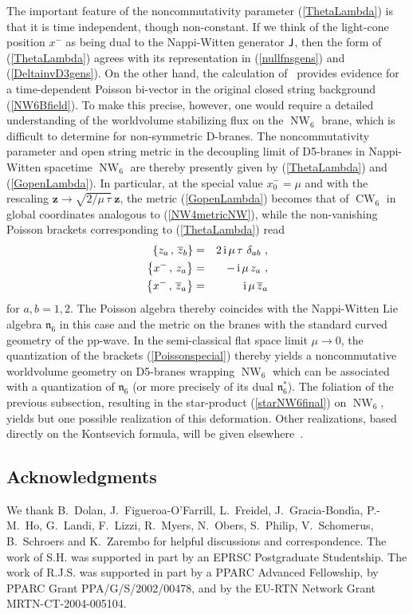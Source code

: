 \documentclass[11pt,a4paper]{article}
\DeclareMathOperator{\NW}{NW}
\DeclareMathOperator{\CW}{CW}
\newcommand{\ii}{{\rm i}}
\newcommand{\mbf}[1]{{\boldsymbol {#1} }}
\def\ii{{\,{\rm i}\,}}
\def\J{{\sf J}}
\def\mz{{\mbf z}}
\newcommand{\beq}{\begin{eqnarray}}
\newcommand{\eeq}{\end{eqnarray}}
\begin{document}
The important feature of the noncommutativity parameter
(\ref{ThetaLambda}) is that it is time independent, though
non-constant. If we think of the light-cone position $x^-$ as being
dual to the Nappi-Witten generator $\J$, then the form of
(\ref{ThetaLambda}) agrees with its representation in
(\ref{nullfnsgens}) and (\ref{DeltainvD3gens}). On the other hand, the
calculation of~\cite{DN1}
provides evidence for a time-dependent Poisson bi-vector in the
original closed string background (\ref{NW6Bfield}). To make this precise,
however, one would require a detailed understanding of the worldvolume
stabilizing flux on the $\NW_6$ brane, which is difficult to determine
for non-symmetric D-branes. The noncommutativity parameter and open
string metric in the decoupling limit of D5-branes in Nappi-Witten
spacetime $\NW_6$ are thereby presently given by (\ref{ThetaLambda})
and (\ref{GopenLambda}). In particular, at the special value
$x_0^-=\mu$ and with the rescaling $\mz\to\sqrt{2/\mu\,\tau}~\mz$, the
metric (\ref{GopenLambda}) becomes that of $\CW_6$ in global
coordinates analogous to (\ref{NW4metricNW}), while the non-vanishing
Poisson brackets corresponding to (\ref{ThetaLambda}) read
\beq
\left\{z_a\,,\,\overline{z}_b\right\}&=&2\ii\mu\,\tau~\delta_{ab} \ ,
\nonumber\\ \left\{x^-\,,\,z_a\right\}&=&-\ii\mu\,z_a \ ,
\nonumber\\ \left\{x^-\,,\,\overline{z}_a\right\}&=&\ii\mu\,
\overline{z}_a
\label{Poissonspecial}\eeq
for $a,b=1,2$. The Poisson algebra thereby coincides with the
Nappi-Witten Lie algebra $\mathfrak{n}_6$ in this case and the metric
on the branes with the standard curved geometry of the pp-wave. In the
semi-classical flat space limit $\mu\to0$, the
quantization of the brackets (\ref{Poissonspecial}) thereby yields a
noncommutative worldvolume geometry on D5-branes wrapping $\NW_6$
which can be associated with a quantization of $\mathfrak{n}_6$ (or
more precisely of its dual $\mathfrak{n}_6^*$). The foliation of the
previous subsection, resulting in the star-product
(\ref{starNW6final}) on $\NW_6$, yields but one possible realization
of this deformation. Other realizations, based directly on the
Kontsevich formula, will be given elsewhere~\cite{inprep}.

\subsection*{Acknowledgments}

We thank B.~Dolan, J.~Figueroa-O'Farrill, L.~Freidel, J.~Gracia-Bond\'{\i}a,
P.-M.~Ho, G.~Landi, F.~Lizzi, R.~Myers, N.~Obers, S.~Philip,
V.~Schomerus, B.~Schroers and K.~Zarembo for helpful discussions and
correspondence. The work of S.H. was supported in part by an EPRSC
Postgraduate Studentship. The work of R.J.S. was supported in part by a
PPARC Advanced Fellowship, by PPARC Grant PPA/G/S/2002/00478, and by
the EU-RTN Network Grant MRTN-CT-2004-005104.
\end{document}
